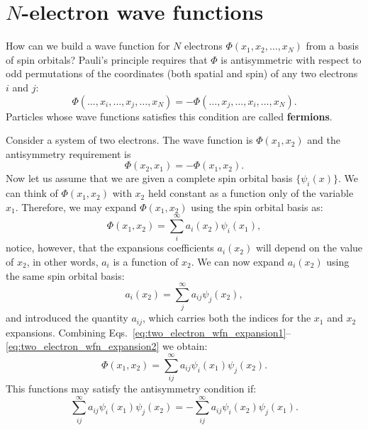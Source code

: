 \documentclass[../Main/chem532-notes.tex]{subfiles}
\begin{document}
\section{$N$-electron wave functions}
How can we build a wave function for $N$ electrons $\Phi(x_1,x_2,\ldots,x_N)$ from a basis of spin orbitals? Pauli's principle requires that $\Phi$ is antisymmetric with respect to odd permutations of the coordinates (both spatial and spin) of any two electrons $i$ and $j$:
\begin{equation}
\Phi(\ldots,x_i,\ldots,x_j,\ldots,x_N) = - \Phi(\ldots,x_j,\ldots,x_i,\ldots,x_N).
\end{equation}
Particles whose wave functions satisfies this condition are called \textbf{fermions}.

\begin{example}
Consider a system of two electrons. The wave function is $\Phi(x_1,x_2)$ and the antisymmetry requirement is
\begin{equation}
 \Phi(x_2,x_1) = - \Phi(x_1,x_2).
\end{equation}
Now let us assume that we are given a complete spin orbital basis $\{ \psi_{i}(x) \}$.
We can think of $\Phi(x_1,x_2)$ with $x_2$ held constant as a function only of the variable $x_1$.
Therefore, we may expand $\Phi(x_1,x_2)$ using the spin orbital basis as:
\begin{equation}\label{eq:two_electron_wfn_expansion1}
\Phi(x_1,x_2) = \sum_{i}^{\infty} a_i(x_2) \psi_i(x_1),
\end{equation}
notice, however, that the expansions coefficients $a_i(x_2)$ will depend on the value of $x_2$, in other words, $a_i$ is a function of $x_2$.
We can now expand $a_i(x_2)$ using the same spin orbital basis:
\begin{equation}\label{eq:two_electron_wfn_expansion2}
a_i(x_2) = \sum_{j}^{\infty} a_{ij} \psi_j(x_2),
\end{equation}
and introduced the quantity $a_{ij}$, which carries both the indices for the $x_1$ and $x_2$ expansions.
Combining Eqs.~\eqref{eq:two_electron_wfn_expansion1}--\eqref{eq:two_electron_wfn_expansion2} we obtain:
\begin{equation}
\Phi(x_1,x_2) = \sum_{ij}^{\infty} a_{ij} \psi_i(x_1) \psi_j(x_2).
\end{equation}
This functions may satisfy the antisymmetry condition if:
\begin{equation}
\sum_{ij}^{\infty} a_{ij} \psi_i(x_1) \psi_j(x_2) = -\sum_{ij}^{\infty} a_{ij} \psi_i(x_2) \psi_j(x_1).

\end{equation}
\end{example}
\end{document}
